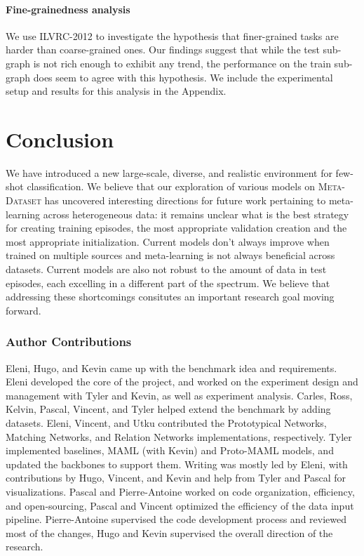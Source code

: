 \documentclass{article} \usepackage{iclr2020_conference,times}
\newcommand{\benchmark}{\textsc{Meta-Dataset}\xspace}
\begin{document}
\paragraph{Fine-grainedness analysis} We use ILVRC-2012 to investigate the hypothesis that finer-grained tasks are harder than coarse-grained ones. Our findings suggest that while the test sub-graph is not rich enough to exhibit any trend, the performance on the train sub-graph does seem to agree with this hypothesis. We include the experimental setup and results for this analysis in the Appendix.

\section{Conclusion}

We have introduced a new large-scale, diverse, and realistic environment for few-shot classification. We believe that our exploration of various models on \benchmark has uncovered
interesting directions for future work pertaining to meta-learning across heterogeneous data: it remains unclear what is the best strategy for creating training episodes, the most appropriate validation creation and the most appropriate initialization. Current models don't always improve when trained on multiple sources and meta-learning is not always beneficial across datasets. Current models are also not robust to the amount of data in test episodes, each excelling in a different part of the spectrum. We believe that addressing these shortcomings consitutes an important research goal moving forward.



\ificlrfinal
\subsubsection*{Author Contributions}

Eleni, Hugo, and Kevin came up with the benchmark idea and requirements.  Eleni
developed the core of the project, and worked on the experiment design and
management with Tyler and Kevin, as well as experiment analysis. Carles, Ross,
Kelvin, Pascal, Vincent, and Tyler helped extend the benchmark by adding
datasets. Eleni, Vincent, and Utku contributed the Prototypical Networks,
Matching Networks, and Relation Networks implementations, respectively.
Tyler implemented baselines, MAML (with
Kevin) and Proto-MAML models, and updated the backbones to support them.
Writing was mostly led by Eleni, with contributions by Hugo, Vincent, and Kevin
and help from Tyler and Pascal for visualizations. Pascal and Pierre-Antoine
worked on code organization, efficiency, and open-sourcing, Pascal and Vincent
optimized the efficiency of the data input pipeline. Pierre-Antoine supervised
the code development process and reviewed most of the changes, Hugo and Kevin
supervised the overall direction of the research.
\end{document}
